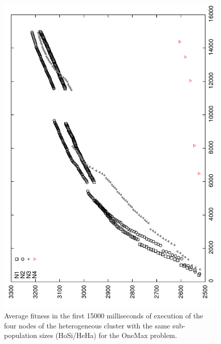 \begin{figure}
\centering 
\includegraphics[angle=-90,scale =0.4] {gfx/adaptiveresults/generationsONEMAXhomosize.pdf}
\caption{Average fitness in the first 15000 milliseconds of execution of the four nodes of the heterogeneous cluster with the same sub-po\-pu\-la\-tion sizes (HoSi/HeHa) for the OneMax problem.}
\label{fig:gensonemaxhomosize}
\end{figure}

